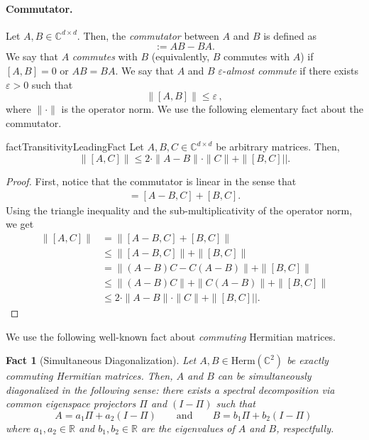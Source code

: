 \documentclass[11pt]{article}
\theoremstyle{plain}
\newtheorem{fact}[theorem]{Fact}
\newcommand{\eps}{\varepsilon}
\begin{document}
\paragraph{Commutator.} Let $A,B \in \mathbb{C}^{d \times d}$. Then, the \emph{commutator} between $A$ and $B$ is defined as
\begin{equation}
            [A, B] := AB - BA.
        \end{equation}
We say that $A$ \emph{commutes} with $B$ (equivalently, $B$ commutes with $A$) if $[A, B] = 0$ or $AB = BA$. We say that $A$ and $B$ $\eps$-\emph{almost commute} if there exists $\eps >0 $ such that
\begin{equation}
\|[A,B]\| \leq \eps \, ,
        \end{equation}
where $\|\cdot\|$ is the operator norm.
We use the following elementary fact about the commutator.
\begin{restatable}{fact}{TransitivityLeadingFact}\label{lem:transitivity-of-almost-commutatitivty}
Let $A,B,C \in \mathbb{C}^{d \times d}$ be arbitrary matrices. Then,
\begin{equation}
\| [A,C] \| \leq 2 \cdot \|A-B\| \cdot \|C\|+ \| [B,C]||.    
\end{equation}
\end{restatable}

\begin{proof}
First, notice that the commutator is linear in the sense that
\begin{align}
[A,C] = [A-B,C] + [B,C].    
\end{align}
Using the triangle inequality and the sub-multiplicativity of the operator norm, we get
\begin{align}
\| [A,C] \| &= \| [A-B,C] + [B,C] \| \\    
&\leq \| [A-B,C]\| + \|[B,C] \| \\
&= \| (A-B)C - C(A-B)\| + \|[B,C] \| \\
&\leq \| (A-B)C\| + \|C(A-B)\| + \|[B,C] \|\\
&\leq 2 \cdot \|A-B\| \cdot \|C\| + \| [B,C]||.
\end{align}
\end{proof}
\vspace{-0.2cm}We use the following well-known fact about \emph{commuting} Hermitian matrices.

\begin{fact}[Simultaneous Diagonalization]\label{fact:sim-diag}
    Let $A,B \in \mathrm{Herm}(\mathbb{C}^{2})$ be exactly commuting Hermitian matrices. Then, $A$ and $B$ can be \emph{simultaneously diagonalized} in the following sense: there exists a spectral decomposition via common eigenspace \emph{projectors} $\Pi$ and $(I-\Pi)$ such that
    \begin{equation}
        A = a_1 \Pi + a_2 (I -\Pi) \quad\quad \text{and} \quad\quad B = b_1 \Pi + b_2 (I - \Pi) \, 
    \end{equation}
    where $a_1,a_2 \in \mathbb{R}$ and $b_1,b_2 \in \mathbb{R}$ are the eigenvalues of $A$ and $B$, respectfully.
\end{fact}
\end{document}
